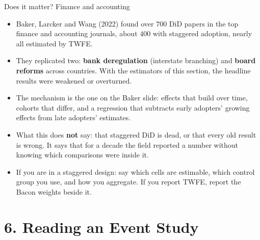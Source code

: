 \documentclass[
  11pt,
  ignorenonframetext,
  aspectratio=169,
]{beamer}
\providecommand{\tightlist}{%
  \setlength{\itemsep}{0pt}\setlength{\parskip}{0pt}}
\begin{document}
\begin{frame}{Does it matter? Finance and accounting}
\protect{}\label{does-it-matter-finance-and-accounting}
\begin{itemize}
\tightlist
\item
  Baker, Larcker and Wang (2022) found over \(700\) DiD papers in the
  top finance and accounting journals, about \(400\) with staggered
  adoption, nearly all estimated by TWFE.
\item
  They replicated two: \textbf{bank deregulation} (interstate branching)
  and \textbf{board reforms} across countries. With the estimators of
  this section, the headline results were weakened or overturned.
\item
  The mechanism is the one on the Baker slide: effects that build over
  time, cohorts that differ, and a regression that subtracts early
  adopters' growing effects from late adopters' estimates.
\end{itemize}

\vspace{0.3em}

\begin{itemize}
\tightlist
\item
  What this does \textbf{not} say: that staggered DiD is dead, or that
  every old result is wrong. It says that for a decade the field
  reported a number without knowing which comparisons were inside it.
\item
  If you are in a staggered design: say which cells are estimable, which
  control group you use, and how you aggregate. If you report TWFE,
  report the Bacon weights beside it.
\end{itemize}
\end{frame}

\section{6. Reading an Event Study}\label{reading-an-event-study}
\end{document}
